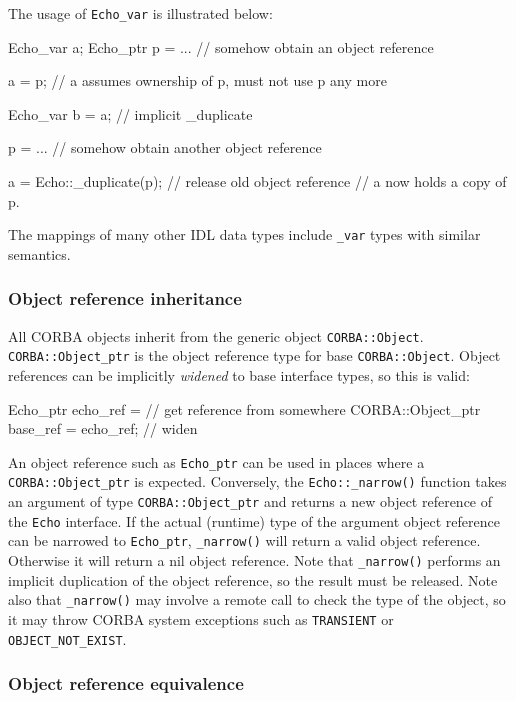 \documentclass[11pt,twoside,a4paper]{book}
\newcommand{\type}[1]{\texttt{#1}}
\newcommand{\intf}[1]{\texttt{#1}}
\newcommand{\code}[1]{\texttt{#1}}
\newcommand{\op}[1]{\texttt{#1()}}
\newcommand{\dsc}{\discretionary{}{}{}}
\begin{document}
The usage of \type{Echo\_var} is illustrated below:

\begin{cxxlisting}
Echo_var a;
Echo_ptr p = ... // somehow obtain an object reference

a = p;           // a assumes ownership of p, must not use p any more

Echo_var b = a;  // implicit _duplicate

p = ...          // somehow obtain another object reference

a = Echo::_duplicate(p);     // release old object reference
                             // a now holds a copy of p.
\end{cxxlisting}

The mappings of many other IDL data types include \type{\_var} types
with similar semantics.


\subsubsection{Object reference inheritance}

All CORBA objects inherit from the generic object
\type{CORBA::Object}.  \type{CORBA::\dsc{}Object\_ptr} is the object
reference type for base \type{CORBA::Object}. Object references can be
implicitly \emph{widened} to base interface types, so this is valid:

\begin{cxxlisting}
Echo_ptr echo_ref = // get reference from somewhere
CORBA::Object_ptr base_ref = echo_ref; // widen
\end{cxxlisting}

An object reference such as \type{Echo\_ptr} can be used in places
where a \type{CORBA::\dsc{}Object\_ptr} is expected. Conversely, the
\op{Echo::\_narrow} function takes an argument of type
\type{CORBA::Object\_ptr} and returns a new object reference of the
\intf{Echo} interface.  If the actual (runtime) type of the argument
object reference can be narrowed to \type{Echo\_ptr}, \op{\_narrow}
will return a valid object reference. Otherwise it will return a nil
object reference. Note that \op{\_narrow} performs an implicit
duplication of the object reference, so the result must be released.
Note also that \op{\_narrow} may involve a remote call to check the
type of the object, so it may throw CORBA system exceptions such as
\code{TRANSIENT} or \code{OBJECT\_NOT\_EXIST}.


\subsubsection{Object reference equivalence}
\end{document}
